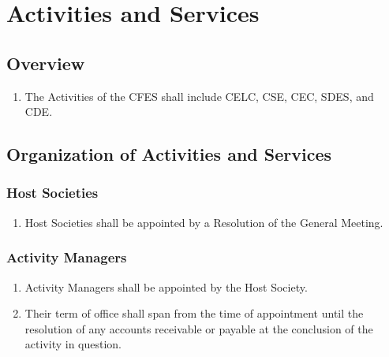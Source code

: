 \section{Activities and Services}
\label{activities-and-services}

\subsection{Overview}
\label{activities-and-services-overview}

\begin{enumerate}
 \item The Activities of the CFES shall include CELC, CSE, CEC, SDES, and CDE.
\end{enumerate}

\subsection{Organization of Activities and Services}
\label{activities-and-services-organization-of-activities-and-services}

\subsubsection{Host Societies}
\label{organization-of-activities-and-services-host-societies}

\begin{enumerate}
 \item Host Societies shall be appointed by a Resolution of the General Meeting.
\end{enumerate}

\subsubsection{Activity Managers}
\label{organization-of-activities-and-services-activity-managers}

\begin{enumerate}
 \item Activity Managers shall be appointed by the Host Society.
 \item Their term of office shall span from the time of appointment until the resolution of any accounts receivable or payable at the conclusion of the activity in question.
\end{enumerate}
